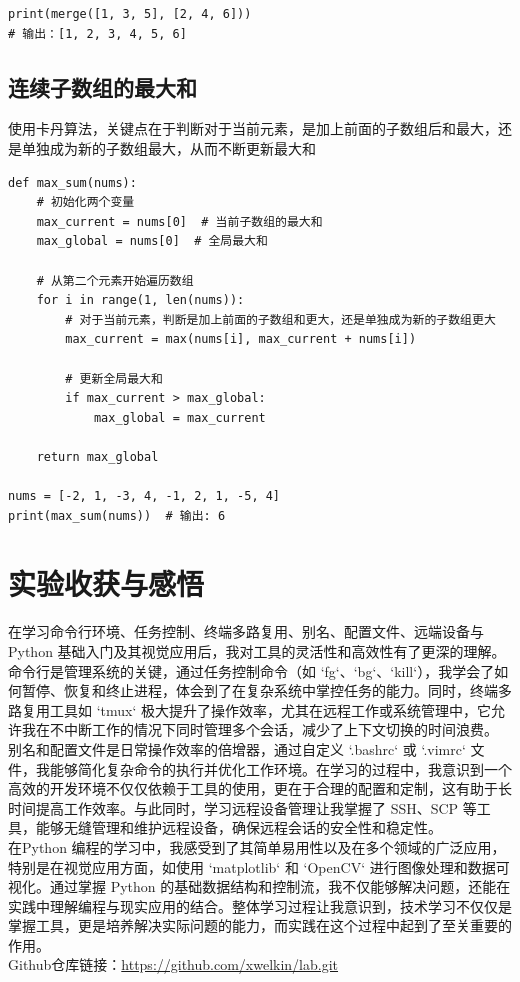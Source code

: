 \documentclass[UTF8,a4paper]{ctexart}
\begin{document}
\begin{sloppypar}
\begin{lstlisting}
print(merge([1, 3, 5], [2, 4, 6]))  
# 输出：[1, 2, 3, 4, 5, 6]
\end{lstlisting}

\subsection{连续子数组的最大和}
	使用卡丹算法，关键点在于判断对于当前元素，是加上前面的子数组后和最大，还是单独成为新的子数组最大，从而不断更新最大和
\begin{lstlisting}
def max_sum(nums):
    # 初始化两个变量
    max_current = nums[0]  # 当前子数组的最大和
    max_global = nums[0]  # 全局最大和

    # 从第二个元素开始遍历数组
    for i in range(1, len(nums)):
        # 对于当前元素，判断是加上前面的子数组和更大，还是单独成为新的子数组更大
        max_current = max(nums[i], max_current + nums[i])

        # 更新全局最大和
        if max_current > max_global:
            max_global = max_current

    return max_global

nums = [-2, 1, -3, 4, -1, 2, 1, -5, 4]
print(max_sum(nums))  # 输出: 6
\end{lstlisting}
	
	
	


	\section{实验收获与感悟}
	在学习命令行环境、任务控制、终端多路复用、别名、配置文件、远端设备与 Python 基础入门及其视觉应用后，我对工具的灵活性和高效性有了更深的理解。命令行是管理系统的关键，通过任务控制命令（如 `fg`、`bg`、`kill`），我学会了如何暂停、恢复和终止进程，体会到了在复杂系统中掌控任务的能力。同时，终端多路复用工具如 `tmux` 极大提升了操作效率，尤其在远程工作或系统管理中，它允许我在不中断工作的情况下同时管理多个会话，减少了上下文切换的时间浪费。\\
	\indent 别名和配置文件是日常操作效率的倍增器，通过自定义 `.bashrc` 或 `.vimrc` 文件，我能够简化复杂命令的执行并优化工作环境。在学习的过程中，我意识到一个高效的开发环境不仅仅依赖于工具的使用，更在于合理的配置和定制，这有助于长时间提高工作效率。与此同时，学习远程设备管理让我掌握了 SSH、SCP 等工具，能够无缝管理和维护远程设备，确保远程会话的安全性和稳定性。\\
	\indent 在Python 编程的学习中，我感受到了其简单易用性以及在多个领域的广泛应用，特别是在视觉应用方面，如使用 `matplotlib` 和 `OpenCV` 进行图像处理和数据可视化。通过掌握 Python 的基础数据结构和控制流，我不仅能够解决问题，还能在实践中理解编程与现实应用的结合。整体学习过程让我意识到，技术学习不仅仅是掌握工具，更是培养解决实际问题的能力，而实践在这个过程中起到了至关重要的作用。\\
	
	Github仓库链接：\url{https://github.com/xwelkin/lab.git}
	
\end{sloppypar}
\end{document}
